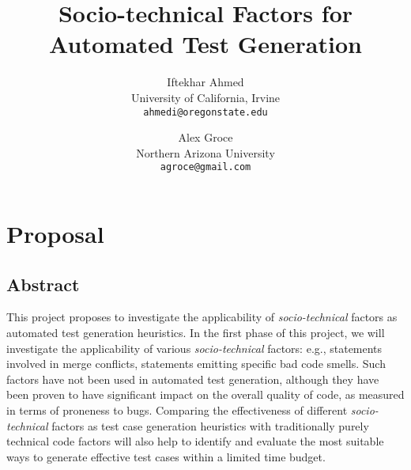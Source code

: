 \documentclass[10pt]{article}
\title{Socio-technical Factors for Automated Test Generation}
\author{
  Iftekhar Ahmed\\
  University of California, Irvine\\
  \texttt{ahmedi@oregonstate.edu}
  \and
  Alex Groce\\
  Northern Arizona University\\
  \texttt{agroce@gmail.com}
}
\date{}
\begin{document}
\maketitle

\section{Proposal}

\subsection{Abstract}

This project proposes to investigate the applicability of \emph{socio-technical} factors as automated test generation heuristics. In the first phase of this project, we will investigate the applicability of various \emph{socio-technical} factors: e.g., statements involved in merge conflicts, statements emitting specific bad code smells.   Such factors have not been used in automated test generation, although they have been proven to have significant impact on the overall quality of code, as measured in terms of proneness to bugs. Comparing the effectiveness of different \emph{socio-technical} factors as test case generation heuristics with traditionally purely technical code factors will also help to identify and evaluate the most suitable ways to generate effective test cases within a limited time budget.


\end{document}
